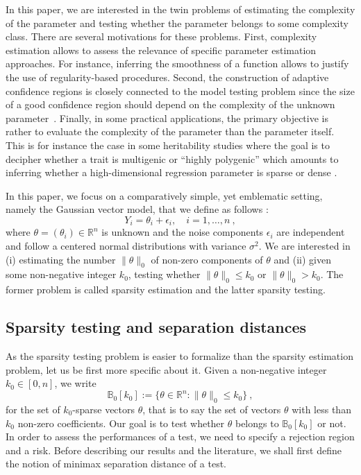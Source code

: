 \documentclass[twoside,11pt]{article}
\def\beq{\begin{equation}}
\def\eeq{\end{equation}}
\def\bbB{\mathbb{B}}
\newcommand{\<}{\langle}
\renewcommand{\>}{\rangle}
\begin{document}
In this paper, we are interested in the twin  problems of estimating the complexity of the parameter and testing whether the parameter belongs to some complexity class. There are several motivations for these problems. First, complexity estimation allows to assess the relevance of specific parameter estimation approaches. For instance, inferring the smoothness of a function allows to justify the use of regularity-based procedures. Second, the construction of adaptive confidence regions is closely connected to the model testing problem since the size of a good confidence region should depend on the complexity of the unknown parameter~\cite{MR2906872}. Finally, in some practical applications, the primary objective is rather to evaluate the complexity of the parameter than the parameter itself. This is for instance the case in some heritability studies where the goal is to decipher whether a trait is multigenic or ``highly polygenic'' which amounts to inferring whether a high-dimensional regression parameter is sparse or dense \cite{maher:2008,toro:2014}.




\medskip 



  
In this paper, we 
focus on a comparatively simple, yet emblematic setting, namely the Gaussian vector model, that we define as follows :%
\beq\label{eq:model} 
Y_i= \theta_i + \epsilon_i , \quad i=1,\ldots, n\ ,
\eeq
where $\theta=(\theta_i) \in \mathbb R^n$ is unknown and the noise components $\epsilon_i$ are independent and follow a centered normal distributions with variance $\sigma^2$. We are interested  in (i) estimating the number $\|\theta\|_0$ of non-zero components of $\theta$ and (ii) given some non-negative integer $k_0$, testing whether $\|\theta\|_0\leq k_0$ or $\|\theta\|_0> k_0$. The former problem is called sparsity estimation and the latter sparsity testing. 

\subsection{Sparsity testing and separation distances}

As the sparsity testing problem is easier to formalize than the sparsity estimation problem, let us be first more specific about it. 
Given a non-negative integer $k_0\in [0,n]$, we write 
\beq\label{eq:def_B0}
\bbB_0[k_0] := \{\theta \in \mathbb R^n : \|\theta\|_0 \leq k_0\}\ ,
 \eeq
for the set of $k_0$-sparse vectors $\theta$, that is to say the set of vectors $\theta$ with less than $k_0$ non-zero coefficients. Our goal is to test whether $\theta$ belongs to $\bbB_0[k_0]$ or not. In order to assess the performances of a test, we need to specify a rejection region and a risk. Before describing our results and the literature, we shall first define the notion  of minimax separation distance of a test. 
\end{document}
